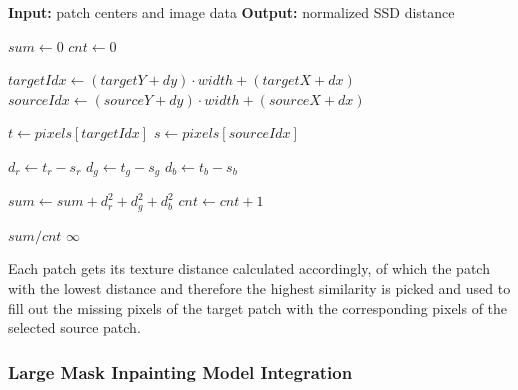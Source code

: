 \begin{algorithm}[ht!]
\caption{Exemplar-Based Image Inpainting local candidate search difference calculation}
\label{alg:ELTMcandidateSearch}
\begin{algorithmic}[4]
    \State \textbf{Input:} patch centers and image data
    \State \textbf{Output:} normalized SSD distance

    \State $sum \gets 0$
    \State $cnt \gets 0$


            \State $targetIdx \gets (targetY+dy)\cdot width + (targetX+dx)$
            \State $sourceIdx \gets (sourceY+dy)\cdot width + (sourceX+dx)$

            \State $t \gets pixels[targetIdx]$
            \State $s \gets pixels[sourceIdx]$

            \State $d_r \gets t_r - s_r$
            \State $d_g \gets t_g - s_g$
            \State $d_b \gets t_b - s_b$

            \State $sum \gets sum + d_r^2 + d_g^2 + d_b^2$
            \State $cnt \gets cnt + 1$

        \EndFor
    \EndFor

        \State \Return $sum / cnt$
    \Else
        \State \Return $\infty$
    \EndIf
\EndFunction
\end{algorithmic}
\end{algorithm}

Each patch gets its texture distance calculated accordingly, of which the patch with the lowest distance and therefore the highest similarity is picked and used to fill out the missing pixels of the target patch with the corresponding pixels of the selected source patch.

\subsubsection{Large Mask Inpainting Model Integration}

